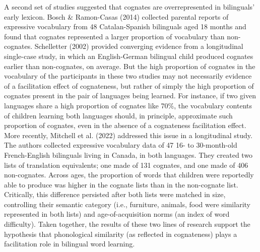 \documentclass[
  12pt,
  b5paperpaper,
  twoside]{scrreprt}
\begin{document}
A second set of studies suggested that cognates are overrepresented in
bilinguals' early lexicon. Bosch \& Ramon-Casas (2014) collected
parental reports of expressive vocabulary from 48 Catalan-Spanish
bilinguals aged 18 months and found that cognates represented a larger
proportion of vocabulary than non-cognates. Schelletter (2002) provided
converging evidence from a longitudinal single-case study, in which an
English-German bilingual child produced cognates earlier than
non-cognates, on average. But the high proportion of cognates in the
vocabulary of the participants in these two studies may not necessarily
evidence of a facilitation effect of cognateness, but rather of simply
the high proportion of cognates present in the pair of languages being
learned. For instance, if two given languages share a high proportion of
cognates like 70\%, the vocabulary contents of children learning both
languages should, in principle, approximate such proportion of cognates,
even in the absence of a cognateness facilitation effect. More recently,
Mitchell et al. (2022) addressed this issue in a longitudinal study. The
authors collected expressive vocabulary data of 47 16- to 30-month-old
French-English bilinguals living in Canada, in both languages. They
created two lists of translation equivalents; one made of 131 cognates,
and one made of 406 non-cognates. Across ages, the proportion of words
that children were reportedly able to produce was higher in the cognate
lists than in the non-cognate list. Critically, this difference
persisted after both lists were matched in size, controlling their
semantic category (i.e., furniture, animals, food were similarity
represented in both lists) and age-of-acquisition norms (an index of
word difficulty). Taken together, the results of these two lines of
research support the hypothesis that phonological similarity (as
reflected in cognateness) plays a facilitation role in bilingual word
learning.
\end{document}
